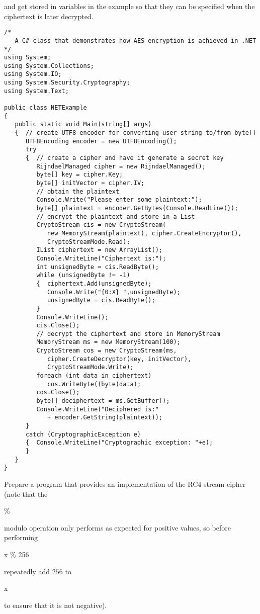 and get stored in variables in the example so that they can be specified when
the ciphertext is later decrypted.
\begin{lstlisting}[caption=AES encryption in C\#]
/*
   A C# class that demonstrates how AES encryption is achieved in .NET
*/
using System;
using System.Collections;
using System.IO;
using System.Security.Cryptography;
using System.Text;

public class NETExample
{
   public static void Main(string[] args)
   {  // create UTF8 encoder for converting user string to/from byte[]
      UTF8Encoding encoder = new UTF8Encoding();
      try
      {  // create a cipher and have it generate a secret key
         RijndaelManaged cipher = new RijndaelManaged();
         byte[] key = cipher.Key;
         byte[] initVector = cipher.IV;
         // obtain the plaintext
         Console.Write("Please enter some plaintext:");
         byte[] plaintext = encoder.GetBytes(Console.ReadLine());
         // encrypt the plaintext and store in a List
         CryptoStream cis = new CryptoStream(
            new MemoryStream(plaintext), cipher.CreateEncryptor(),
            CryptoStreamMode.Read);
         IList ciphertext = new ArrayList();
         Console.WriteLine("Ciphertext is:");
         int unsignedByte = cis.ReadByte();
         while (unsignedByte != -1)
         {  ciphertext.Add(unsignedByte);
            Console.Write("{0:X} ",unsignedByte);
            unsignedByte = cis.ReadByte();
         }
         Console.WriteLine();
         cis.Close();
         // decrypt the ciphertext and store in MemoryStream
         MemoryStream ms = new MemoryStream(100);
         CryptoStream cos = new CryptoStream(ms,
            cipher.CreateDecryptor(key, initVector),
            CryptoStreamMode.Write);
         foreach (int data in ciphertext)
            cos.WriteByte((byte)data);
         cos.Close();
         byte[] deciphertext = ms.GetBuffer();
         Console.WriteLine("Deciphered is:"
            + encoder.GetString(plaintext));
      }
      catch (CryptographicException e)
      {  Console.WriteLine("Cryptographic exception: "+e);
      }
   }
}
\end{lstlisting}


\begin{exercise}[Implementation of RC4]
Prepare a program that provides an implementation of the RC4 stream cipher
(note that the \begin{code}\%\end{code} modulo operation only performs as
expected for positive values, so before performing \begin{code}x \% 256\end{code}
repeatedly add $256$ to \begin{code}x\end{code} to ensure that it is not negative).
\end{exercise}


